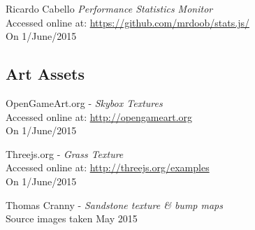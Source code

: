 \begin{thebibliography}{99}
        Ricardo Cabello
        \textit{Performance Statistics Monitor}\\
        Accessed online at:
        \href{https://github.com/mrdoob/stats.js/}{https://github.com/mrdoob/stats.js/}\\
        On 1/June/2015



\subsection{Art Assets}
\label{ref:art_assets}
        OpenGameArt.org -
        \textit{Skybox Textures}\\
        Accessed online at:
        \href{http://opengameart.org}{http://opengameart.org}\\
        On 1/June/2015

        Threejs.org - \textit{Grass Texture}\\
        Accessed online at:
        \href{http://threejs.org/examples/textures}{http://threejs.org/examples}\\
        On 1/June/2015

        Thomas Cranny - \textit{Sandstone texture \& bump maps}\\
        Source images taken May 2015



\end{thebibliography}
